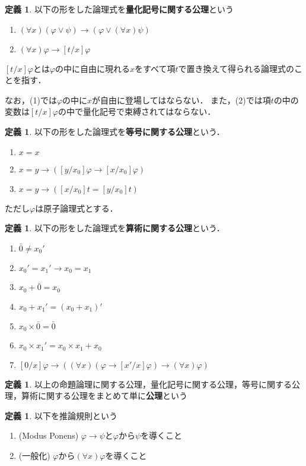 \documentclass[uplatex]{jsarticle}
\theoremstyle{definition} %
\newtheorem{defi}[thm]{定義}
\begin{document}
\begin{defi}
以下の形をした論理式を{\bfseries 量化記号に関する公理}という
\begin{enumerate}
\item $(\forall x) (\varphi \lor \psi) \to (\varphi \lor (\forall x) \psi)$
\item $(\forall x) \varphi \to [t/x]\varphi$
\end{enumerate}

$[t/x]\varphi$とは$\varphi$の中に自由に現れる$x$をすべて項$t$で置き換えて得られる論理式のことを指す．

なお，(1)では$\varphi$の中に$x$が自由に登場してはならない．
また，(2)では項$t$の中の変数は$[t/x]\varphi$の中で量化記号で束縛されてはならない．
\end{defi}

\begin{defi}
以下の形をした論理式を{\bfseries 等号に関する公理}という．
\begin{enumerate}
\item $x = x$
\item $x = y \to ([y/x_0]\varphi \to [x/x_0]\varphi)$
\item $x = y \to ([x/x_0]t = [y/x_0]t)$
\end{enumerate}
ただし$\varphi$は原子論理式とする．
\end{defi}

\begin{defi}
以下の形をした論理式を{\bfseries 算術に関する公理}という．
\begin{enumerate}
\item $\bar{0} \ne x_0'$
\item $x_0' = x_1' \to x_0 = x_1$
\item $x_0 + \bar{0} = x_0$
\item $x_0 + x_1' = (x_0 + x_1)'$
\item $x_0 \times \bar{0} = \bar{0}$
\item $x_0 \times x_1' = x_0 \times x_1 + x_0$
\item $[0/x]\varphi \to ((\forall x)(\varphi \to [x'/x]\varphi) \to (\forall x) \varphi)$
\end{enumerate}
\end{defi}

\begin{defi}
以上の命題論理に関する公理，量化記号に関する公理，等号に関する公理，算術に関する公理をまとめて単に{\bfseries 公理}という
\end{defi}

\begin{defi}
以下を推論規則という
\begin{enumerate}
\item (Modus Ponens) $\varphi \to \psi$と$\varphi$から$\psi$を導くこと
\item (一般化) $\varphi$から$(\forall x) \varphi$を導くこと
\end{enumerate}
\end{defi}
\end{document}
